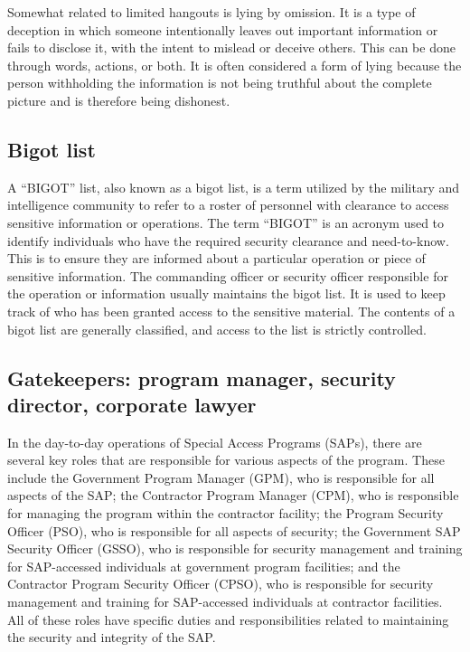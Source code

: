 
Somewhat related to limited hangouts is lying by omission. It is a type of deception in which someone intentionally leaves out important information or fails to disclose it, with the intent to mislead or deceive others. This can be done through words, actions, or both. It is often considered a form of lying because the person withholding the information is not being truthful about the complete picture and is therefore being dishonest.


\subsection{Bigot list}

A ``BIGOT'' list, also known as a bigot list, is a term utilized by the military and intelligence community to refer to a roster of personnel with clearance to access sensitive information or operations. The term ``BIGOT'' is an acronym used to identify individuals who have the required security clearance and need-to-know. This is to ensure they are informed about a particular operation or piece of sensitive information. The commanding officer or security officer responsible for the operation or information usually maintains the bigot list. It is used to keep track of who has been granted access to the sensitive material. The contents of a bigot list are generally classified, and access to the list is strictly controlled.


\subsection{Gatekeepers: program manager, security director, corporate lawyer}

In the day-to-day operations of Special Access Programs (SAPs), there are several key roles that are responsible for various aspects of the program. These include the Government Program Manager (GPM), who is responsible for all aspects of the SAP; the Contractor Program Manager (CPM), who is responsible for managing the program within the contractor facility; the Program Security Officer (PSO), who is responsible for all aspects of security; the Government SAP Security Officer (GSSO), who is responsible for security management and training for SAP-accessed individuals at government program facilities; and the Contractor Program Security Officer (CPSO), who is responsible for security management and training for SAP-accessed individuals at contractor facilities. All of these roles have specific duties and responsibilities related to maintaining the security and integrity of the SAP.

